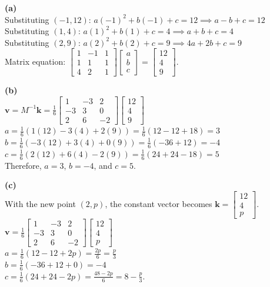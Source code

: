 \begin{solution}
\textbf{(a)} \\
Substituting $(-1, 12)$: $a(-1)^2 + b(-1) + c = 12 \implies a - b + c = 12$ \\
Substituting $(1, 4)$: $a(1)^2 + b(1) + c = 4 \implies a + b + c = 4$ \\
Substituting $(2, 9)$: $a(2)^2 + b(2) + c = 9 \implies 4a + 2b + c = 9$ \\
Matrix equation: $\begin{bmatrix} 1 & -1 & 1 \\ 1 & 1 & 1 \\ 4 & 2 & 1 \end{bmatrix} \begin{bmatrix} a \\ b \\ c \end{bmatrix} = \begin{bmatrix} 12 \\ 4 \\ 9 \end{bmatrix}$.

\medskip
\textbf{(b)} \\
$\mathbf{v} = M^{-1} \mathbf{k} = \frac{1}{6} \begin{bmatrix} 1 & -3 & 2 \\ -3 & 3 & 0 \\ 2 & 6 & -2 \end{bmatrix} \begin{bmatrix} 12 \\ 4 \\ 9 \end{bmatrix}$ \\
$a = \frac{1}{6} (1(12) - 3(4) + 2(9)) = \frac{1}{6}(12 - 12 + 18) = 3$ \\
$b = \frac{1}{6} (-3(12) + 3(4) + 0(9)) = \frac{1}{6}(-36 + 12) = -4$ \\
$c = \frac{1}{6} (2(12) + 6(4) - 2(9)) = \frac{1}{6}(24 + 24 - 18) = 5$ \\
Therefore, $a = 3$, $b = -4$, and $c = 5$.

\medskip
\textbf{(c)} \\
With the new point $(2, p)$, the constant vector becomes $\mathbf{k} = \begin{bmatrix} 12 \\ 4 \\ p \end{bmatrix}$. \\
$\mathbf{v} = \frac{1}{6} \begin{bmatrix} 1 & -3 & 2 \\ -3 & 3 & 0 \\ 2 & 6 & -2 \end{bmatrix} \begin{bmatrix} 12 \\ 4 \\ p \end{bmatrix}$ \\
$a = \frac{1}{6} (12 - 12 + 2p) = \frac{2p}{6} = \frac{p}{3}$ \\
$b = \frac{1}{6} (-36 + 12 + 0) = -4$ \\
$c = \frac{1}{6} (24 + 24 - 2p) = \frac{48 - 2p}{6} = 8 - \frac{p}{3}$.


\end{solution}
